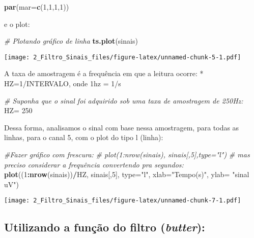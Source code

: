 \documentclass[]{article}
\newenvironment{Shaded}{\begin{snugshade}}{\end{snugshade}}
\newcommand{\KeywordTok}[1]{\textcolor[rgb]{0.13,0.29,0.53}{\textbf{#1}}}
\newcommand{\DataTypeTok}[1]{\textcolor[rgb]{0.13,0.29,0.53}{#1}}
\newcommand{\DecValTok}[1]{\textcolor[rgb]{0.00,0.00,0.81}{#1}}
\newcommand{\StringTok}[1]{\textcolor[rgb]{0.31,0.60,0.02}{#1}}
\newcommand{\CommentTok}[1]{\textcolor[rgb]{0.56,0.35,0.01}{\textit{#1}}}
\newcommand{\OperatorTok}[1]{\textcolor[rgb]{0.81,0.36,0.00}{\textbf{#1}}}
\newcommand{\NormalTok}[1]{#1}
\begin{document}
\begin{Shaded}
\begin{Highlighting}[]
\KeywordTok{par}\NormalTok{(}\DataTypeTok{mar=}\KeywordTok{c}\NormalTok{(}\DecValTok{1}\NormalTok{,}\DecValTok{1}\NormalTok{,}\DecValTok{1}\NormalTok{,}\DecValTok{1}\NormalTok{))}
\end{Highlighting}
\end{Shaded}

e o plot:

\begin{Shaded}
\begin{Highlighting}[]
\CommentTok{# Plotando gráfico de linha}
\KeywordTok{ts.plot}\NormalTok{(sinais)}
\end{Highlighting}
\end{Shaded}

\texttt{[image: 2\_Filtro\_Sinais\_files/figure-latex/unnamed-chunk-5-1.pdf]}

A taxa de amostragem é a frequência em que a leitura ocorre: *
HZ=1/INTERVALO, onde 1hz = 1/s

\begin{Shaded}
\begin{Highlighting}[]
\CommentTok{# Suponha que o sinal foi adquirido sob uma taxa de amostragem de 250Hz: }
\NormalTok{HZ=}\StringTok{ }\DecValTok{250}
\end{Highlighting}
\end{Shaded}

Dessa forma, analisamos o sinal com base nessa amostragem, para todas as
linhas, para o canal 5, com o plot do tipo l (linha):

\begin{Shaded}
\begin{Highlighting}[]
\CommentTok{#Fazer gráfico com frescura:}
\CommentTok{# plot(1:nrow(sinais), sinais[,5],type="l")}
\CommentTok{# mas preciso considerar a frequência convertendo pra segundos:}
\KeywordTok{plot}\NormalTok{((}\DecValTok{1}\OperatorTok{:}\KeywordTok{nrow}\NormalTok{(sinais))}\OperatorTok{/}\NormalTok{HZ, sinais[,}\DecValTok{5}\NormalTok{], }\DataTypeTok{type=}\StringTok{"l"}\NormalTok{, }\DataTypeTok{xlab=}\StringTok{"Tempo(s)"}\NormalTok{, }\DataTypeTok{ylab=} \StringTok{"sinal uV"}\NormalTok{)}
\end{Highlighting}
\end{Shaded}

\texttt{[image: 2\_Filtro\_Sinais\_files/figure-latex/unnamed-chunk-7-1.pdf]}

\subsection{\texorpdfstring{Utilizando a função do filtro
(\emph{butter}):}{Utilizando a função do filtro (butter):}}\label{utilizando-a-funcao-do-filtro-butter}
\end{document}
